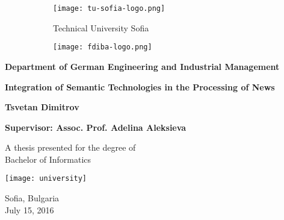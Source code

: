 
    \begin{figure}  
        \begin{subfigure}[b]{0.3\textwidth}
            \texttt{[image: tu-sofia-logo.png]}
        \end{subfigure}
        \begin{subfigure}[b]{0.36\textwidth}
            \centering
            \Large{Technical University Sofia}
        \end{subfigure}
        \begin{subfigure}[b]{0.3\textwidth}
            \texttt{[image: fdiba-logo.png]}
        \end{subfigure}
    \end{figure}
    \begin{center}
        \textbf{\large{Department of German Engineering and Industrial Management}}
        
        \vspace*{4cm}
        
        \textbf{\Huge{Integration of Semantic Technologies in the Processing of News}}
    
        \vspace{1.5cm}

        \textbf{\large{Tsvetan Dimitrov}}
        
        \vspace{1.5cm}
        
        \textbf{\large{Supervisor: Assoc. Prof. Adelina Aleksieva}}

        
        \vfill
        
        A thesis presented for the degree of\\
        Bachelor of Informatics
        
        \vspace{0.8cm}
        
        \texttt{[image: university]}
    
        Sofia, Bulgaria\\
        July 15, 2016
    \end{center}

